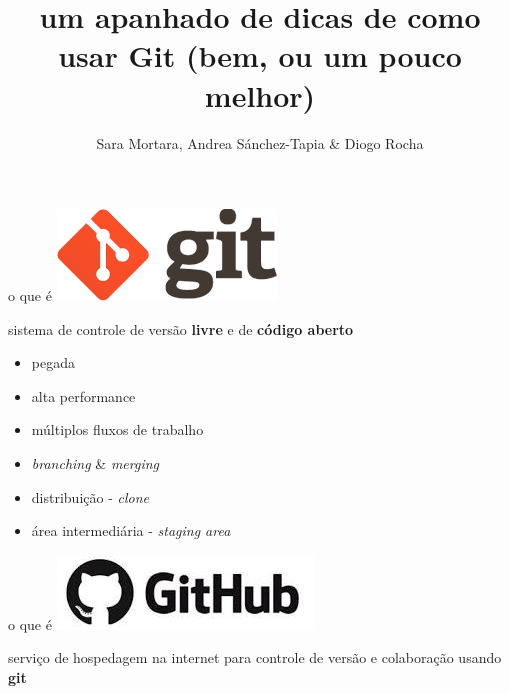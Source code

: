 \documentclass[11pt]{beamer}
\author{Sara Mortara, Andrea Sánchez-Tapia \& Diogo Rocha}
\title{um apanhado de dicas de como usar Git (bem, ou um pouco melhor)}
\date{}
\begin{document}
\begin{frame}
\titlepage
\end{frame}


\begin{frame}{o que é \includegraphics[scale=0.2]{logo-git.png}}

sistema de controle de versão \textbf{livre} e de \textbf{código aberto}

\begin{itemize}
 \pause \item   pegada
 \pause \item alta performance
 \pause \item múltiplos fluxos de trabalho
 \pause \item \textit{branching} & \textit{merging}
 \pause \item distribuição - \textit{clone}
 \pause \item área intermediária - \textit{staging area}
\end{itemize}

\end{frame}

\begin{frame}{o que é \includegraphics[scale=0.2]{github.jpeg}}

serviço de hospedagem na internet para controle de versão e colaboração usando \textbf{git}

\begin{itemize}

\end{itemize}

\end{frame}
\end{document}
